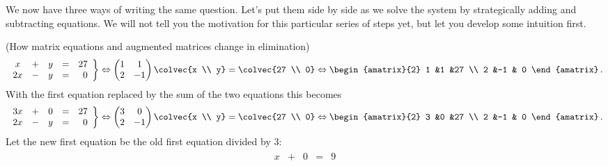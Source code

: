 
We now have three ways of writing the same question. 
Let's put them side by side as we solve the system by strategically adding and subtracting equations. 
We will not tell you the motivation for this particular series of steps yet, but let you develop some intuition first. 

\begin{example}  (How matrix equations and augmented matrices change in elimination)
\begin{eqnarray*}
   \left.
\begin{array}{ccccr}
	x&+&y & = & 27 \\
	2x&-& y & = &\  0 
     \end{array}
   \right\} 
   \Leftrightarrow
    \begin{pmatrix}
      1             &1  \\
      2             &-1
    \end{pmatrix}
  \colvec{x \\ y}
  =
  \colvec{27 \\ 0}
  \Leftrightarrow
 \begin{amatrix}{2}
1 &1 &27 \\ 2 &-1 & 0
\end{amatrix}\, .
  \end{eqnarray*}
With the first equation replaced by the sum of the two equations this becomes
\begin{eqnarray*}
   \left.
\begin{array}{ccccr}
	3x& +& 0 & = & 27 \\
	2x&-& y & = &\  0 
     \end{array}
   \right\} 
   \Leftrightarrow
    \begin{pmatrix}
      3             &0  \\
      2             &-1
    \end{pmatrix}
  \colvec{x \\ y}
  =
  \colvec{27 \\ 0}
  \Leftrightarrow
 \begin{amatrix}{2}
3 &0 &27 \\ 2 &-1 & 0
\end{amatrix}\, .
  \end{eqnarray*}
Let the new first equation be the old first equation divided by 3:
 \begin{eqnarray*}
   \left.
\begin{array}{ccccr}
	x& +& 0 & = & 9 \\

\end{array}
\end{eqnarray*}
\end{example}
